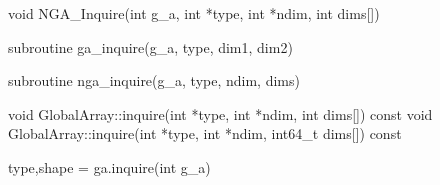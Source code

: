 \documentclass[12pt]{article}
\begin{document}


\begin{capi}
\begin{ccode}
void NGA_Inquire(int g_a, int *type, int *ndim, int dims[])
\end{ccode}
\begin{funcargs}
\end{funcargs}
\end{capi}

\begin{f2dapi}
\begin{fcode}
subroutine ga_inquire(g_a, type, dim1, dim2)
\end{fcode}
\begin{funcargs}
\end{funcargs}
\end{f2dapi}

\begin{fapi}
\begin{fcode}
subroutine nga_inquire(g_a, type, ndim, dims)
\end{fcode}
\begin{funcargs}
\end{funcargs}
\end{fapi}

\begin{cxxapi}
\begin{cxxcode}
void GlobalArray::inquire(int *type, int *ndim, int dims[]) const
void GlobalArray::inquire(int *type, int *ndim, int64_t dims[]) const
\end{cxxcode}
\begin{funcargs}
\end{funcargs}
\end{cxxapi}

\begin{pyapi}
\begin{pycode}
type,shape = ga.inquire(int g_a)
\end{pycode}
\begin{funcargs}
\end{funcargs}
\end{pyapi}
\end{document}
